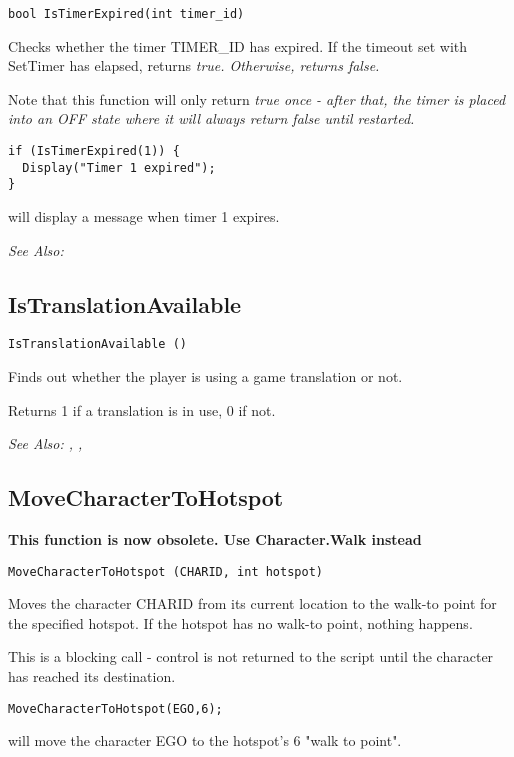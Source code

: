 \begin{verbatim}
bool IsTimerExpired(int timer_id)
\end{verbatim}
Checks whether the timer TIMER_ID has expired.
If the timeout set with SetTimer has elapsed, returns \it{true}.
Otherwise, returns \it{false}.

Note that this function will only return \it{true} once - after that, the timer
is placed into an OFF state where it will always return \it{false} until restarted.

\begin{verbatim}
if (IsTimerExpired(1)) {
  Display("Timer 1 expired");
}
\end{verbatim}
will display a message when timer 1 expires.

\it{See Also:} 


\subsection{IsTranslationAvailable}\label{IsTranslationAvailable}%

\begin{verbatim}
IsTranslationAvailable ()
\end{verbatim}
Finds out whether the player is using a game translation or not.

Returns 1 if a translation is in use, 0 if not.

\it{See Also:} ,
,


\subsection{MoveCharacterToHotspot}\label{MoveCharacterToHotspot}%

\bf{This function is now obsolete. Use Character.Walk instead}

\begin{verbatim}
MoveCharacterToHotspot (CHARID, int hotspot)
\end{verbatim}
Moves the character CHARID from its current location to the walk-to point
for the specified hotspot. If the hotspot has no walk-to point, nothing
happens.

This is a blocking call - control is not returned to the script until the
character has reached its destination.

\begin{verbatim}
MoveCharacterToHotspot(EGO,6);
\end{verbatim}
will move the character EGO to the hotspot's 6 "walk to point".

